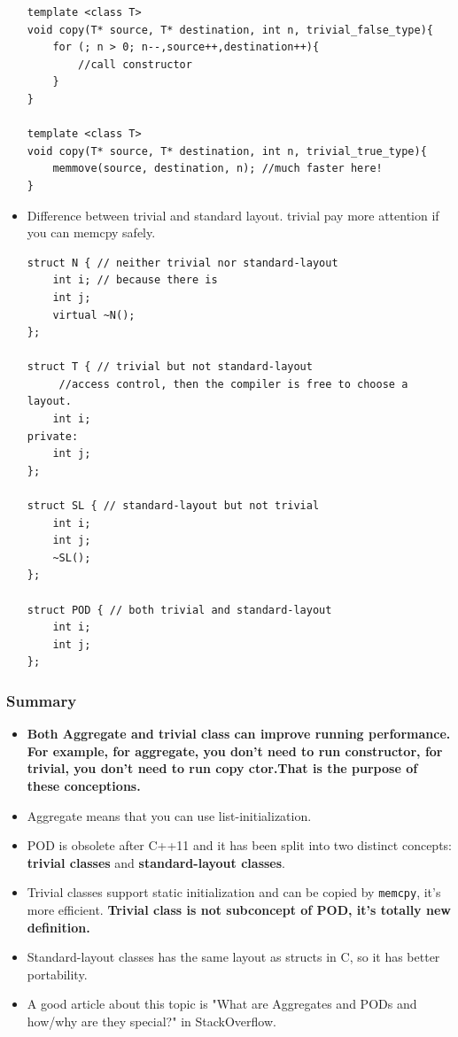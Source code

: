 \documentclass[a4paper,11pt,twoside]{book}
\begin{document}
\begin{itemize}
\begin{lstlisting}[numbers=none]
template <class T> 
void copy(T* source, T* destination, int n, trivial_false_type){
	for (; n > 0; n--,source++,destination++){
		//call constructor
	}
}
	
template <class T> 
void copy(T* source, T* destination, int n, trivial_true_type){
	memmove(source, destination, n); //much faster here!
}
\end{lstlisting}

\item Difference between trivial and standard layout. trivial pay more attention if you can memcpy safely.
\begin{lstlisting}[numbers=none]
struct N { // neither trivial nor standard-layout
	int i; // because there is 
	int j;
	virtual ~N();
};

struct T { // trivial but not standard-layout
	 //access control, then the compiler is free to choose a layout.
	int i;
private:
	int j;
};

struct SL { // standard-layout but not trivial
	int i;
	int j;
	~SL();
};

struct POD { // both trivial and standard-layout
	int i;
	int j;
};
\end{lstlisting}	
	
\end{itemize}


\subsubsection{Summary}
\begin{itemize}
		\item \textbf{Both Aggregate and trivial class can improve running performance. For example, for aggregate, you don't need to run constructor, for trivial, you don't need to run copy ctor.That is the purpose of these conceptions.}

	\item Aggregate means that you can use list-initialization.

	\item POD is obsolete after C++11 and it has been split into two distinct concepts: \textbf{trivial classes} and \textbf{standard-layout classes}.

	\item Trivial classes support static initialization and can be copied by \texttt{memcpy}, it's more efficient. \textbf{Trivial class is not subconcept of POD, it's totally new definition.} 

	\item Standard-layout classes has the same layout as structs in C, so it has better portability.

	\item A good article about this topic is "What are Aggregates and PODs and how/why are they special?" in StackOverflow. 
\end{itemize}
\end{document}
